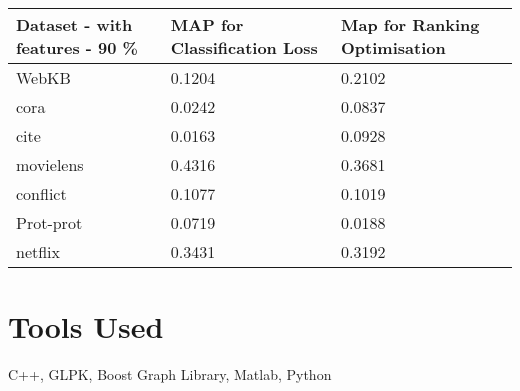 \begin{center}
\begin{table}
    \begin{tabular}{|l|l|l|}
    \hline
    Dataset - with features - 90 \% & MAP for Classification Loss & Map for Ranking Optimisation \\ \hline
    WebKB                           & 0.1204                      & 0.2102                       \\ \hline
    cora                            & 0.0242                      & 0.0837                       \\ \hline
    cite                            & 0.0163                      & 0.0928                       \\ \hline
    movielens                       & 0.4316                      & 0.3681                       \\ \hline
    conflict                        & 0.1077                      & 0.1019                       \\ \hline
    Prot-prot                       & 0.0719                      & 0.0188                       \\ \hline
    netflix                         & 0.3431                      & 0.3192                       \\ \hline
    \end{tabular}
\end{table}
\end{center}

\begin{center}

\end{center}

\begin{center}

\end{center}




\section*{Tools Used}
C++, GLPK, Boost Graph Library, Matlab, Python
